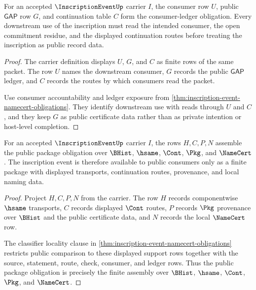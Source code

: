 \begin{theorem}
\label{thm:inscription-event-obligation-consumer-ledger}
For an accepted $\InscriptionEventUp$ carrier $I$, the consumer row $U$, public $\mathsf{GAP}$ row $G$, and continuation table $C$ form the consumer-ledger obligation. Every downstream use of the inscription must read the intended consumer, the open commitment residue, and the displayed continuation routes before treating the inscription as public record data.
\end{theorem}
\begin{proof}
The carrier definition displays $U$, $G$, and $C$ as finite rows of the same packet. The row $U$ names the downstream consumer, $G$ records the public $\mathsf{GAP}$ ledger, and $C$ records the routes by which consumers read the packet.

Use consumer accountability and ledger exposure from \autoref{thm:inscription-event-namecert-obligations}. They identify downstream use with reads through $U$ and $C$, and they keep $G$ as public certificate data rather than as private intention or host-level completion.
\end{proof}

\begin{theorem}
\label{thm:inscription-event-obligation-public-package}
For an accepted $\InscriptionEventUp$ carrier $I$, the rows $H,C,P,N$ assemble the public package obligation over $\BHist$, $\hsame$, $\Cont$, $\Pkg$, and $\NameCert$. The inscription event is therefore available to public consumers only as a finite package with displayed transports, continuation routes, provenance, and local naming data.
\end{theorem}
\begin{proof}
Project $H,C,P,N$ from the carrier. The row $H$ records componentwise $\hsame$ transports, $C$ records displayed $\Cont$ routes, $P$ records $\Pkg$ provenance over $\BHist$ and the public certificate data, and $N$ records the local $\NameCert$ row.

The classifier locality clause in \autoref{thm:inscription-event-namecert-obligations} restricts public comparison to these displayed support rows together with the source, statement, route, check, consumer, and ledger rows. Thus the public package obligation is precisely the finite assembly over $\BHist$, $\hsame$, $\Cont$, $\Pkg$, and $\NameCert$.
\end{proof}


